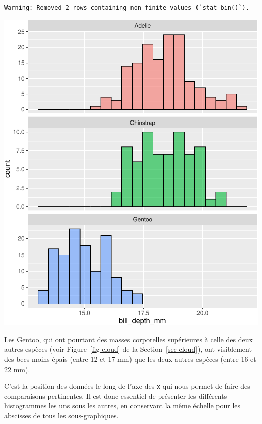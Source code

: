 \documentclass[
  a4paper,
  DIV=11,
  numbers=noendperiod,
  oneside]{scrreprt}
\begin{document}
\begin{verbatim}
Warning: Removed 2 rows containing non-finite values (`stat_bin()`).
\end{verbatim}

\includegraphics{03-visualization_files/figure-pdf/unnamed-chunk-69-1.pdf}

Les Gentoo, qui ont pourtant des masses corporelles supérieures à celle
des deux autres espèces (voir Figure~\ref{fig-cloud} de la
Section~\ref{sec-cloud}), ont visiblement des becs moins épais (entre 12
et 17 mm) que les deux autres espèces (entre 16 et 22 mm).

\begin{tcolorbox}[enhanced jigsaw, arc=.35mm, opacityback=0, colbacktitle=quarto-callout-important-color!10!white, bottomrule=.15mm, coltitle=black, colframe=quarto-callout-important-color-frame, breakable, toprule=.15mm, title=\textcolor{quarto-callout-important-color}{\faExclamation}\hspace{0.5em}{Important}, leftrule=.75mm, titlerule=0mm, bottomtitle=1mm, toptitle=1mm, left=2mm, rightrule=.15mm, opacitybacktitle=0.6, colback=white]

C'est la position des données le long de l'axe des \texttt{x} qui nous
permet de faire des comparaisons pertinentes. Il est donc essentiel de
présenter les différents histogrammes les uns sous les autres, en
conservant la même échelle pour les abscisses de tous les
sous-graphiques.

\end{tcolorbox}
\end{document}
